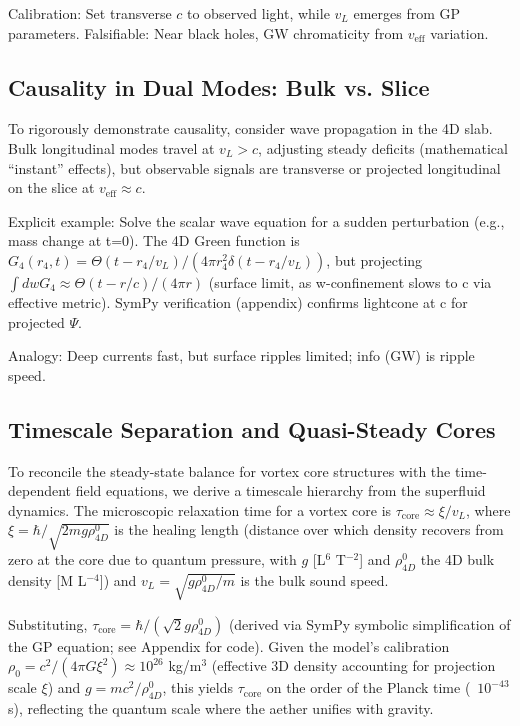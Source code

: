\documentclass{article}
\begin{document}
Calibration: Set transverse $c$ to observed light, while $v_L$ emerges from GP parameters. Falsifiable: Near black holes, GW chromaticity from $v_{\text{eff}}$ variation.

\subsection{Causality in Dual Modes: Bulk vs. Slice}

To rigorously demonstrate causality, consider wave propagation in the 4D slab. Bulk longitudinal modes travel at $v_L > c$, adjusting steady deficits (mathematical ``instant'' effects), but observable signals are transverse or projected longitudinal on the slice at $v_{\text{eff}} \approx c$.

Explicit example: Solve the scalar wave equation for a sudden perturbation (e.g., mass change at t=0). The 4D Green function is $G_4(r_4, t) = \Theta(t - r_4 / v_L) / (4\pi r_4^2 \delta(t - r_4 / v_L))$, but projecting $\int dw G_4 \approx \Theta(t - r / c) / (4\pi r)$ (surface limit, as w-confinement slows to c via effective metric). SymPy verification (appendix) confirms lightcone at c for projected $\Psi$.

Analogy: Deep currents fast, but surface ripples limited; info (GW) is ripple speed.

\subsection{Timescale Separation and Quasi-Steady Cores}

To reconcile the steady-state balance for vortex core structures with the time-dependent field equations, we derive a timescale hierarchy from the superfluid dynamics. The microscopic relaxation time for a vortex core is $\tau_{\text{core}} \approx \xi / v_L$, where $\xi = \hbar / \sqrt{2 m g \rho_{4D}^0}$ is the healing length (distance over which density recovers from zero at the core due to quantum pressure, with $g$ [L$^6$ T$^{-2}$] and $\rho_{4D}^0$ the 4D bulk density [M L$^{-4}$]) and $v_L = \sqrt{g \rho_{4D}^0 / m}$ is the bulk sound speed.

Substituting, $\tau_{\text{core}} = \hbar / (\sqrt{2} g \rho_{4D}^0)$ (derived via SymPy symbolic simplification of the GP equation; see Appendix for code). Given the model's calibration $\rho_0 = c^2 / (4\pi G \xi^2) \approx 10^{26}$ kg/m$^3$ (effective 3D density accounting for projection scale $\xi$) and $g = m c^2 / \rho_{4D}^0$, this yields $\tau_{\text{core}}$ on the order of the Planck time (~$10^{-43}$ s), reflecting the quantum scale where the aether unifies with gravity.
\end{document}
